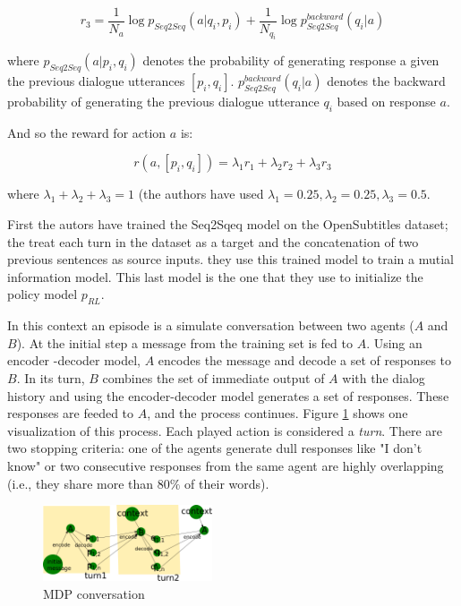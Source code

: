 \begin{equation}
r_3 = \frac{1}{N_{a}} \log p_{Seq2Seq}(a| q_i, p_i) + \frac{1}{N_{q_{i}}} \log p_{Seq2Seq}^{backward}(q_i| a)  
\end{equation}

where $p_{Seq2Seq}(a| p_i, q_i)$ denotes the probability of generating
response a given the previous dialogue utterances $[p_i, q_i]$. $p_{Seq2Seq}^{backward}(q_i| a)$ denotes the backward probability
of generating the previous dialogue utterance $q_i$ based on response $a$.

And so the reward for action $a$ is:

\begin{equation}
r(a, [p_i, q_i]) = \lambda_1 r_1 + \lambda_2 r_2 + \lambda_3 r_3
\end{equation}

where $\lambda_1 + \lambda_2 + \lambda_3 = 1$ (the authors have used $\lambda_1 = 0.25, \lambda_2 = 0.25, \lambda_3 = 0.5$.

\par First the autors have trained the Seq2Sqeq model on the OpenSubtitles dataset; the treat each turn in the dataset as a target and the concatenation of two previous sentences as source inputs. they use this trained model to train a mutial information model. This last model is the one that they use to initialize the policy model $p_{RL}$.

\par In this context an episode is a simulate conversation between two agents ($A$ and $B$). At the initial step a message from the training set is fed to $A$. Using an encoder -decoder model, $A$ encodes the message and decode a set of responses to $B$. In its turn, $B$ combines the set of immediate output of $A$ with the dialog history and using the encoder-decoder model generates a set of responses. These responses are feeded to $A$, and the process continues. Figure \ref{MDPConver} shows one visualization of this process. Each played action is considered a \textit{turn}. There are two stopping criteria: one of the agents generate dull responses like "I don't know" or two consecutive responses from the same agent are highly overlapping (i.e., they share more than $80\%$ of their words).


\begin{figure}[ht!]
\label{MDPConver}
\includegraphics[width=5cm]{img/MDPconversation_placeholder.png}
\caption{MDP conversation}
\end{figure}

